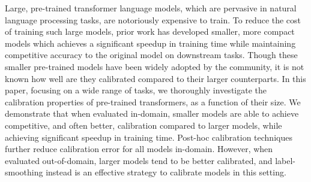Large, pre-trained transformer language models, which are pervasive in natural language processing tasks, are notoriously expensive to train. To reduce the cost of training such large models, prior work has developed smaller, more compact models which achieves a significant speedup in training time while maintaining competitive accuracy to the original model on downstream tasks. Though these smaller pre-trained models have been widely adopted by the community, it is not known how well are they calibrated compared to their larger counterparts. In this paper, focusing on a wide range of tasks, we thoroughly investigate the calibration properties of pre-trained transformers, as a function of their size. We demonstrate that when evaluated in-domain, smaller models are able to achieve competitive, and often better, calibration compared to larger models, while achieving significant speedup in training time. Post-hoc calibration techniques further reduce calibration error for all models in-domain. However, when evaluated out-of-domain, larger models tend to be better calibrated, and label-smoothing instead is an effective strategy to calibrate models in this setting.
